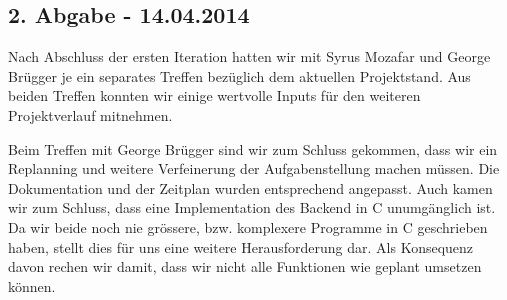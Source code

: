 \subsection{2. Abgabe - 14.04.2014}
Nach Abschluss der ersten Iteration hatten wir mit Syrus Mozafar und George Brügger je ein separates Treffen bezüglich dem aktuellen Projektstand. Aus beiden Treffen konnten wir einige wertvolle Inputs für den weiteren Projektverlauf mitnehmen. 

Beim Treffen mit George Brügger sind wir zum Schluss gekommen, dass wir ein Replanning und weitere Verfeinerung der Aufgabenstellung machen müssen. Die Dokumentation und der Zeitplan wurden entsprechend angepasst. Auch kamen wir zum Schluss, dass eine Implementation des Backend in C unumgänglich ist. Da wir beide noch nie grössere, bzw. komplexere Programme in C geschrieben haben, stellt dies für uns eine weitere Herausforderung dar. Als Konsequenz davon rechen wir damit, dass wir nicht alle Funktionen wie geplant umsetzen können.

